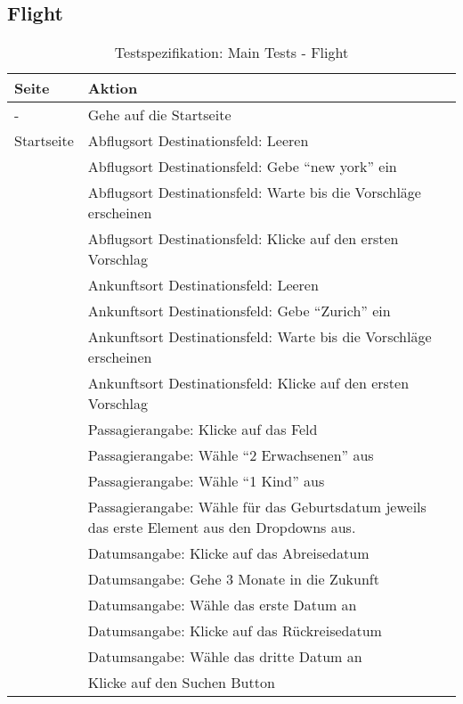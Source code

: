 \subsection{Flight}
\begin{table}[H] 
	\caption{Testspezifikation: Main Tests - Flight}
	\centering
		
	\begin{tabularx}{0.9\textwidth}{ | l | X | } 
		\hline 
		\textbf{Seite} & \textbf{Aktion} \\ \hline 
		\multirow{1}{*}{-} & Gehe auf die Startseite \\ \hline
		\multirow{1}{*}{Startseite} & Abflugsort Destinationsfeld: Leeren \\ \cline{2-2}
		& Abflugsort Destinationsfeld: Gebe "`new york"' ein \\ \cline{2-2}
		& Abflugsort Destinationsfeld: Warte bis die Vorschläge erscheinen \\ \cline{2-2}
		& Abflugsort Destinationsfeld: Klicke auf den ersten Vorschlag \\ \cline{2-2}
		& Ankunftsort Destinationsfeld: Leeren \\ \cline{2-2}
		& Ankunftsort Destinationsfeld: Gebe "`Zurich"' ein \\ \cline{2-2}
		& Ankunftsort Destinationsfeld: Warte bis die Vorschläge erscheinen \\ \cline{2-2}
		& Ankunftsort Destinationsfeld: Klicke auf den ersten Vorschlag \\ \cline{2-2}
		& Passagierangabe: Klicke auf das Feld \\ \cline{2-2}
		& Passagierangabe: Wähle "`2 Erwachsenen"' aus \\ \cline{2-2}
		& Passagierangabe: Wähle "`1 Kind"' aus \\ \cline{2-2}
		& Passagierangabe: Wähle für das Geburtsdatum jeweils das erste Element aus den Dropdowns aus.  \\ \cline{2-2}
		& Datumsangabe: Klicke auf das Abreisedatum \\ \cline{2-2}
		& Datumsangabe: Gehe 3 Monate in die Zukunft \\ \cline{2-2}
		& Datumsangabe: Wähle das erste Datum an \\ \cline{2-2}
		& Datumsangabe: Klicke auf das Rückreisedatum \\ \cline{2-2}
		& Datumsangabe: Wähle das dritte Datum an \\ \cline{2-2}
		& Klicke auf den Suchen Button \\ \hline
				

\end{tabularx}
\end{table}
